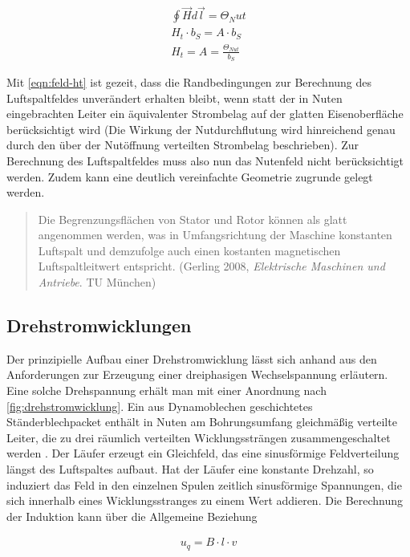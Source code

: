 \begin{align}
\oint \vec{H}d\vec{l} = \Theta_Nut \\
H_t\cdot b_S = A\cdot b_S \\
H_t = A = \frac{\Theta_{Nut}}{b_S} \label{eqn:feld-ht}
\end{align}

Mit \autoref{eqn:feld-ht} ist gezeit, dass die Randbedingungen zur Berechnung des Luftspaltfeldes unverändert erhalten bleibt, wenn statt der in Nuten eingebrachten Leiter ein äquivalenter Strombelag auf der glatten Eisenoberfläche berücksichtigt wird (Die Wirkung der Nutdurchflutung wird hinreichend genau durch den über der Nutöffnung verteilten Strombelag beschrieben).
Zur Berechnung des Luftspaltfeldes muss also nun das Nutenfeld \autocite[S.~14]{ternes2013} nicht berücksichtigt werden.
Zudem kann eine deutlich vereinfachte Geometrie zugrunde gelegt werden.

\begin{quote}
Die Begrenzungsflächen von Stator und Rotor können als glatt angenommen werden, was in Umfangsrichtung der Maschine konstanten Luftspalt und demzufolge auch einen kostanten magnetischen Luftspaltleitwert entspricht. (Gerling 2008, \emph{Elektrische Maschinen und Antriebe}. TU München)
\end{quote}

\subsection{Drehstromwicklungen}

Der prinzipielle Aufbau einer Drehstromwicklung lässt sich anhand aus den Anforderungen zur Erzeugung einer dreiphasigen Wechselspannung erläutern.
Eine solche Drehspannung erhält man mit einer Anordnung nach \autoref{fig:drehstromwicklung}.
Ein aus Dynamoblechen geschichtetes Ständerblechpacket enthält in Nuten am Bohrungsumfang gleichmäßig verteilte Leiter, die zu drei räumlich verteilten Wicklungssträngen zusammengeschaltet werden \autocite[S.~141]{fischer2009}.
Der Läufer erzeugt ein Gleichfeld, das eine sinusförmige Feldverteilung längst des Luftspaltes aufbaut.
Hat der Läufer eine konstante Drehzahl, so induziert das Feld in den einzelnen Spulen zeitlich sinusförmige Spannungen, die sich innerhalb eines Wicklungsstranges zu einem Wert addieren.
Die Berechnung der Induktion kann über die Allgemeine Beziehung

\begin{align}
u_q = B\cdot l \cdot v
\end{align}

